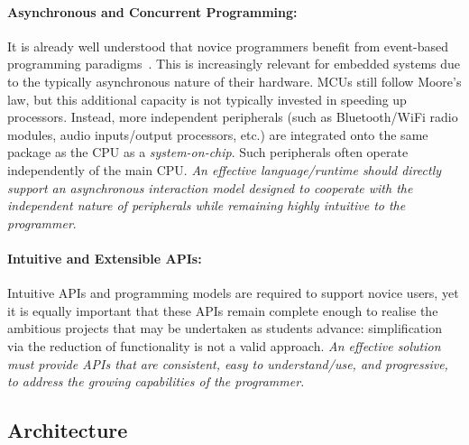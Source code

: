 \paragraph{Asynchronous and Concurrent Programming:}
It is already well understood that novice programmers benefit from event-based programming paradigms~\cite{maloney2008programming,maloney2010scratch,turbak2014events}. This is increasingly relevant for embedded systems due to the typically asynchronous nature of their hardware. MCUs still follow Moore's law,
but this additional capacity is not typically invested in speeding
up processors. Instead, more independent peripherals (such as Bluetooth/WiFi radio modules, audio inputs/output processors, etc.) are integrated onto the same package as the CPU as a \emph{system-on-chip}. Such peripherals often operate independently of the main CPU. \emph{An effective language/runtime should directly support an asynchronous interaction model designed to cooperate with the independent nature of peripherals while remaining highly intuitive to the programmer}.

\paragraph{Intuitive and Extensible APIs:}
Intuitive APIs and programming models are required to support novice users, yet it is equally important that these APIs remain complete enough to realise the ambitious projects that may be undertaken as students advance: simplification via the reduction of functionality is not a valid approach.
\emph{An effective solution must provide APIs that are consistent, easy to understand/use, and progressive, to address the growing capabilities of the programmer.}

\subsection{Architecture}

